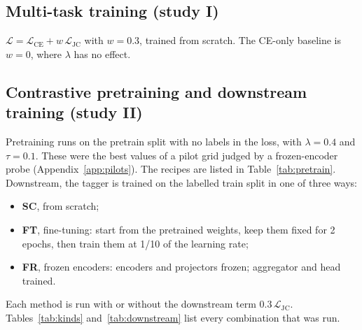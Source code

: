 \documentclass[11pt,a4paper]{article}
\newcommand{\LCE}{\mathcal{L}_{\mathrm{CE}}}
\newcommand{\LJC}{\mathcal{L}_{\mathrm{JC}}}
\begin{document}
\subsection{Multi-task training (study I)}
$\mathcal{L}=\LCE+w\,\LJC$ with $w=0.3$, trained from scratch. The CE-only baseline is
$w=0$, where $\lambda$ has no effect.

\subsection{Contrastive pretraining and downstream training (study II)}
Pretraining runs on the pretrain split with no labels in the loss, with $\lambda=0.4$ and
$\tau=0.1$. These were the best values of a pilot grid judged by a frozen-encoder probe
(Appendix~\ref{app:pilots}). The recipes are listed in Table~\ref{tab:pretrain}.
Downstream, the tagger is trained on the labelled train split in one of three ways:
\begin{itemize}
  \item \textbf{SC}, from scratch;
  \item \textbf{FT}, fine-tuning: start from the pretrained weights, keep them fixed for 2
        epochs, then train them at 1/10 of the learning rate;
  \item \textbf{FR}, frozen encoders: encoders and projectors frozen; aggregator and head
        trained.
\end{itemize}
Each method is run with or without the downstream term $0.3\,\LJC$.
Tables~\ref{tab:kinds} and~\ref{tab:downstream} list every combination that was run.
\end{document}
